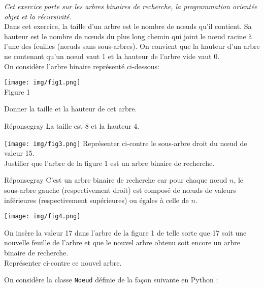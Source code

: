 \documentclass[a4paper,12pt,article,firamath]{nsi}
\begin{document}
\resetquestion
\textit{Cet exercice porte sur les arbres binaires de recherche, la programmation orientée
    objet et la récursivité.}\\

Dans cet exercice, la taille d'un arbre est le nombre de nœuds qu'il contient. Sa hauteur
est le nombre de nœuds du plus long chemin qui joint le nœud racine à l'une des
feuilles (nœuds sans sous-arbres). On convient que la hauteur d'un arbre ne contenant
qu'un nœud vaut 1 et la hauteur de l'arbre vide vaut 0.\\

On considère l'arbre binaire représenté ci-dessous:
\begin{center}
    \texttt{[image: img/fig1.png]}\\
    Figure 1
\end{center}
Donner la taille et la hauteur de cet arbre.\\
\begin{encadrecolore}{Réponse}{gray}
    La taille est 8 et la hauteur 4.
    \end{encadrecolore}
\dleft{7cm}
{
    \texttt{[image: img/fig3.png]}
}{\question Représenter ci-contre le sous-arbre droit du n\oe ud de valeur 15.\\

    \question Justifier que l'arbre de la figure 1 est un arbre binaire de recherche.
}

\begin{encadrecolore}{Réponse}{gray}
    C'est un arbre binaire de recherche car pour chaque n\oe ud $n$, le sous-arbre gauche (respectivement droit) est composé de n\oe uds de valeurs inférieures (respectivement supérieures) ou égales à celle de $n$.
\end{encadrecolore}


\dleft{7cm}
{
    \begin{center}
        \texttt{[image: img/fig4.png]}\\
    \end{center}
}{
    On insère la valeur 17 dans l'arbre de la figure 1 de telle sorte que 17 soit une
    nouvelle feuille de l'arbre et que le nouvel arbre obtenu soit encore un arbre
    binaire de recherche.\\

    \question Représenter ci-contre ce nouvel arbre.
}

On considère la classe \texttt{Noeud} définie de la façon suivante en Python :
\end{document}
